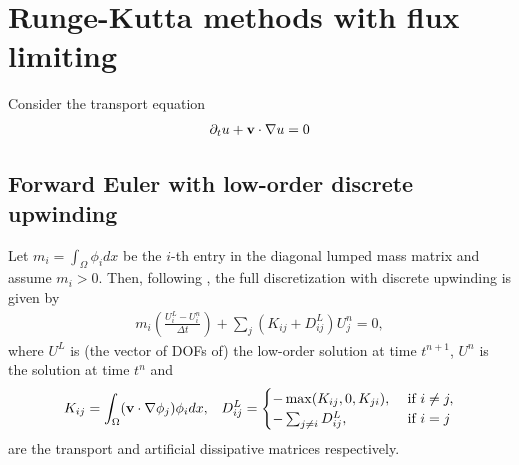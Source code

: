 \documentclass{article}
\numberwithin{remark}{subsection}
\newcommand{\bfv}{{\bf v}}
\begin{document}
\clearpage
\section{Runge-Kutta methods with flux limiting}
Consider the transport equation
\begin{align}\label{transport_equation}
  \partial_t u + \bfv\cdot \nabla u = 0
\end{align}

\subsection{Forward Euler with low-order discrete upwinding}\label{sec:FE_discUpwind}

Let $m_i=\int_\Omega \phi_i dx$ be the $i$-th entry in the diagonal lumped mass matrix
and assume $m_i>0$.
Then, following \cite{kuzmin2012flux},
the full discretization with discrete upwinding is given by
\begin{align}\label{low-order}
  m_i\left(\frac{U_i^L-U_i^n}{\Delta t}\right)+\sum_j\left(K_{ij}+D_{ij}^L\right)U_j^n=0,
\end{align}
where $U^L$ is (the vector of DOFs of) the low-order solution at time $t^{n+1}$,
$U^n$ is the solution at time $t^n$ and 
\begin{align}\label{transport_and_discUpwinding_matrices}
  K_{ij} = \int_\Omega (\bfv\cdot\nabla \phi_j) \phi_i dx,
  & &
  D^L_{ij} =
  \begin{cases}
    -\max(K_{ij},0,K_{ji}), & \text{ if } i\neq j, \\
    -\sum_{j\neq i} D_{ij}^L, & \text{ if } i=j
  \end{cases}
\end{align}
are the transport and artificial dissipative matrices respectively.
\end{document}
